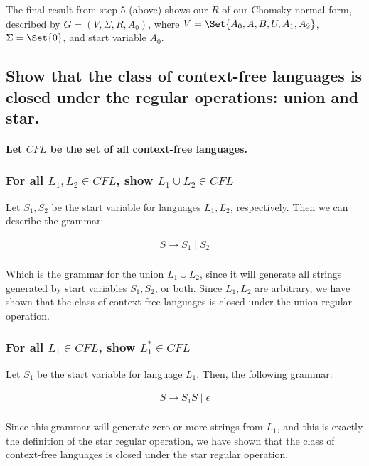 \documentclass{article}
\begin{document}
The final result from step 5 (above) shows our $R$ of our Chomsky normal form, described by $G = (V, \Sigma, R, A_0)$, where $V = \Set{A_0, A, B, U, A_1, A_2}$, $\Sigma = \Set{0}$, and start variable $A_0$. 



\subsection{Show that the class of context-free languages is closed under the regular operations: union and star.}

\paragraph{Let $CFL$ be the set of all context-free languages.}

\subsubsection{For all $L_1, L_2 \in CFL$, show $L_1 \cup L_2 \in CFL$}

Let $S_1, S_2$ be the start variable for languages $L_1, L_2$, respectively.  Then we can describe the grammar:

\begin{align*}
	S \longrightarrow S_1 \;|\; S_2 \\
\end{align*}

Which is the grammar for the union $L_1 \cup L_2$, since it will generate all strings generated by start variables $S_1, S_2$, or both.  Since $L_1, L_2$ are arbitrary, we have shown that the class of context-free languages is closed under the union regular operation.

\subsubsection{For all $L_1 \in CFL$, show $L_1^* \in CFL$}

Let $S_1$ be the start variable for language $L_1$.  Then, the following grammar:

\begin{align*}
	S \longrightarrow S_1S \;|\; \epsilon \\
\end{align*}

Since this grammar will generate zero or more strings from $L_1$, and this is exactly the definition of the star regular operation, we have shown that the class of context-free languages is closed under the star regular operation.
\end{document}
